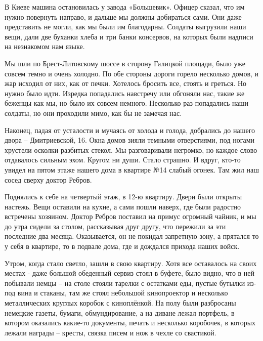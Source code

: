 В Киеве машина остановилась у завода «Большевик». Офицер сказал, что им нужно
повернуть направо, и дальше мы должны добираться сами. Они даже представить не
могли, как мы были им благодарны. Солдаты выгрузили наши вещи, дали две буханки
хлеба и три банки консервов, на которых были надписи на незнакомом нам языке.

Мы шли по Брест-Литовскому шоссе в сторону Галицкой площади, было уже совсем
темно и очень холодно. По обе стороны дороги горело несколько домов, и жар
исходил от них, как от печки. Хотелось бросить все, стоять и греться. Но нужно
было идти. Изредка попадались навстречу или обгоняли нас, такие же беженцы как
мы, но было их совсем немного. Несколько раз попадались наши солдаты, но они
проходили мимо, как бы не замечая нас.

Наконец, падая от усталости и мучаясь от холода и голода, добрались до нашего
двора – Дмитриевской, 16. Окна домов зияли темными отверстиями, под ногами
хрустели осколки разбитых стекол. Мы разговаривали негромко, но каждое слово
отдавалось сильным эхом. Кругом ни души. Стало страшно. И вдруг, кто-то увидел
на пятом этаже нашего дома в квартире №14 слабый огонек. Там жил наш сосед
сверху доктор Ребров.


Поднялись к себе на четвертый этаж, в 12-ю квартиру. Двери были открыты
настежь. Вещи оставили на кухне, а сами пошли наверх, где были радостно
встречены хозяином. Доктор Ребров поставил на примус огромный чайник, и мы до
утра сидели за столом, рассказывая друг другу, что пережили за эти последние
два месяца. Оказывается, он не покидал запретную зону, а прятался то у себя в
квартире, то в подвале дома, где и дождался прихода наших войск.

Утром, когда стало светло, зашли в свою квартиру. Хотя все оставалось на своих
местах - даже большой обеденный сервиз стоял в буфете, было видно, что в ней
побывали немцы – на столе стояли тарелки с остатками еды, пустые бутылки из-под
вина и стаканы, там же стоял небольшой кинопроектор и несколько металлических
круглых коробок с киноплёнкой. На полу были разбросаны немецкие газеты, бумаги,
обмундирование, а на диване лежал портфель, в котором оказались какие-то
документы, печать и несколько коробочек, в которых лежали награды – кресты,
связка писем и нож в чехле со свастикой.


